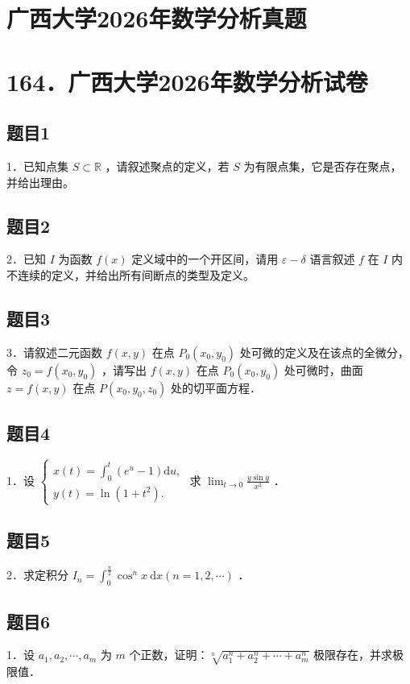 \documentclass{article}
\begin{document}
\section*{广西大学2026年数学分析真题}
\section*{164．广西大学2026年数学分析试卷}

\subsection{题目1}
1．已知点集 \(S \subset \mathbb{R}\) ，请叙述聚点的定义，若 \(S\) 为有限点集，它是否存在聚点，并给出理由。

\subsection{题目2}
2．已知 \(I\) 为函数 \(f(x)\) 定义域中的一个开区间，请用 \(\varepsilon-\delta\) 语言叙述 \(f\) 在 \(I\) 内不连续的定义，并给出所有间断点的类型及定义。

\subsection{题目3}
3．请叙述二元函数 \(f(x, y)\) 在点 \(P_{0}\left(x_{0}, y_{0}\right)\) 处可微的定义及在该点的全微分，令 \(z_{0}=f\left(x_{0}, y_{0}\right)\) ，请写出 \(f(x, y)\) 在点 \(P_{0}\left(x_{0}, y_{0}\right)\) 处可微时，曲面 \(z=f(x, y)\) 在点 \(P\left(x_{0}, y_{0}, z_{0}\right)\) 处的切平面方程．

\subsection{题目4}
1．设 \(\left\{\begin{array}{l}x(t)=\int_{0}^{t}\left(e^{u}-1\right) \mathrm{d} u, \\ y(t)=\ln \left(1+t^{2}\right) .\end{array}\right.\) 求 \(\lim _{t \rightarrow 0} \frac{y \sin y}{x^{2}}\) ．

\subsection{题目5}
2．求定积分 \(I_{n}=\int_{0}^{\frac{\pi}{2}} \cos ^{n} x \mathrm{~d} x(n=1,2, \cdots)\) ．

\subsection{题目6}
1．设 \(a_{1}, a_{2}, \cdots, a_{m}\) 为 \(m\) 个正数，证明：\(\sqrt[n]{a_{1}^{n}+a_{2}^{n}+\cdots+a_{m}^{n}}\) 极限存在，并求极限值．
\end{document}
